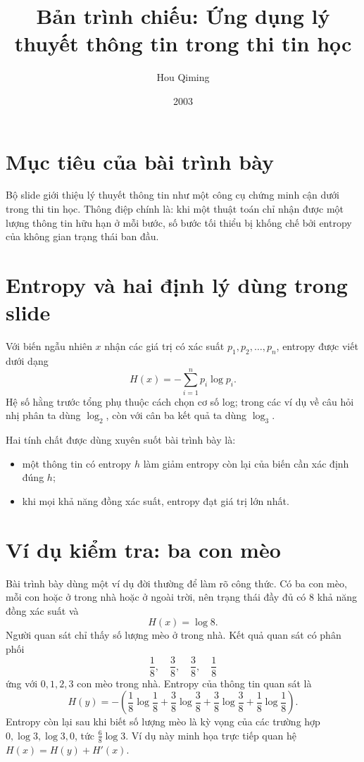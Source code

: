 \documentclass[11pt]{article}
\title{Bản trình chiếu: Ứng dụng lý thuyết thông tin trong thi tin học}
\author{Hou Qiming}
\date{2003}
\begin{document}
\maketitle


\section{Mục tiêu của bài trình bày}

Bộ slide giới thiệu lý thuyết thông tin như một công cụ chứng minh cận dưới
trong thi tin học. Thông điệp chính là: khi một thuật toán chỉ nhận được một
lượng thông tin hữu hạn ở mỗi bước, số bước tối thiểu bị khống chế bởi
entropy của không gian trạng thái ban đầu.

\section{Entropy và hai định lý dùng trong slide}

Với biến ngẫu nhiên \(x\) nhận các giá trị có xác suất
\(p_1,p_2,\ldots,p_n\), entropy được viết dưới dạng
\[
  H(x)=-\sum_{i=1}^{n} p_i\log p_i .
\]
Hệ số hằng trước tổng phụ thuộc cách chọn cơ số log; trong các ví dụ về câu
hỏi nhị phân ta dùng \(\log_2\), còn với cân ba kết quả ta dùng \(\log_3\).

Hai tính chất được dùng xuyên suốt bài trình bày là:
\begin{itemize}
  \item một thông tin có entropy \(h\) làm giảm entropy còn lại của biến cần
  xác định đúng \(h\);
  \item khi mọi khả năng đồng xác suất, entropy đạt giá trị lớn nhất.
\end{itemize}

\section{Ví dụ kiểm tra: ba con mèo}

Bài trình bày dùng một ví dụ đời thường để làm rõ công thức. Có ba con mèo,
mỗi con hoặc ở trong nhà hoặc ở ngoài trời, nên trạng thái đầy đủ có \(8\)
khả năng đồng xác suất và
\[
  H(x)=\log 8 .
\]
Người quan sát chỉ thấy số lượng mèo ở trong nhà. Kết quả quan sát có phân
phối
\[
  \frac18,\quad \frac38,\quad \frac38,\quad \frac18
\]
ứng với \(0,1,2,3\) con mèo trong nhà. Entropy của thông tin quan sát là
\[
  H(y)=-
  \left(
  \frac18\log\frac18+
  \frac38\log\frac38+
  \frac38\log\frac38+
  \frac18\log\frac18
  \right).
\]
Entropy còn lại sau khi biết số lượng mèo là kỳ vọng của các trường hợp
\(0,\log 3,\log 3,0\), tức \(\frac68\log 3\). Ví dụ này minh họa trực tiếp
quan hệ \(H(x)=H(y)+H'(x)\).
\end{document}
